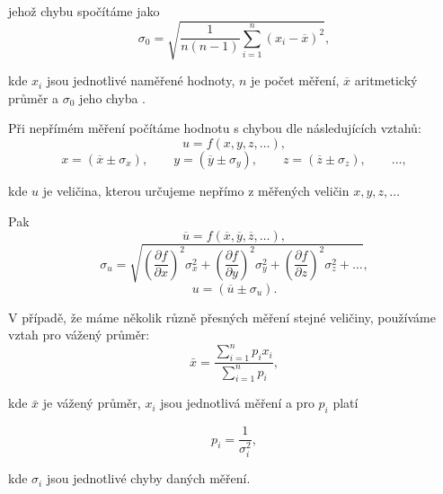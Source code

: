 \documentclass[english]{article}
\begin{document}
	jehož chybu spočítáme jako 
	\begin{equation} \label{eq:chyba_aritmetickeho_prumeru}
	\sigma_0 = \sqrt{\frac{1}{n(n-1)} \sum\limits_{i=1}^{n}\left( x_i - \overline{x} \right)^2 },
	\end{equation}
	
	kde $ x_i $ jsou jednotlivé naměřené hodnoty, $ n $ je počet měření, $ \overline{x} $ aritmetický průměr a $ \sigma_0 $ jeho chyba \cite{bib:chyby}.
	
Při nepřímém měření počítáme hodnotu s chybou dle následujících vztahů:
	\begin{equation}
	u = f(x, y, z, \ldots),
	\end{equation}
	\begin{displaymath}
	x = (\overline{x} \pm \sigma_x), \qquad
	y = (\overline{y} \pm \sigma_y), \qquad
	z = (\overline{z} \pm \sigma_z), \qquad
	\ldots,
	\end{displaymath}
	
	kde $ u $ je veličina, kterou určujeme nepřímo z měřených veličin $ x, y, z, \ldots $ 
	
	Pak
	\begin{displaymath}
	\overline{u} = f(\overline{x}, \overline{y}, \overline{z}, \ldots),
	\end{displaymath}
	\begin{equation}\label{eq:chyba_neprime_mereni}
	\sigma_u = \sqrt{\left( \frac{\partial f}{\partial x} \right)^2 \sigma^2_x + \left( \frac{\partial f}{\partial y} \right)^2 \sigma^2_y + \left( \frac{\partial f}{\partial z} \right)^2 \sigma^2_z + \ldots},
	\end{equation}
	\begin{displaymath}
	u = (\overline{u} \pm \sigma_ u).
	\end{displaymath}
	
V případě, že máme několik různě přesných měření stejné veličiny, používáme vztah pro vážený průměr:
	\begin{equation} 
	\bar{x}=\frac{\sum\limits_{i=1}^{n}p_{i}x_{i}}{\sum\limits_{i=1}^{n}p_{i}},
	\end{equation}
	
	kde $\bar{x}$ je vážený průměr, $x_{i}$ jsou jednotlivá měření a pro $p_{i}$ platí
	 
	\begin{equation}
	p_{i}=\frac{1}{\sigma_{i}^{2}},
	\end{equation}
	
	kde $\sigma_{i}$ jsou jednotlivé chyby daných měření.
	 
\end{document}
